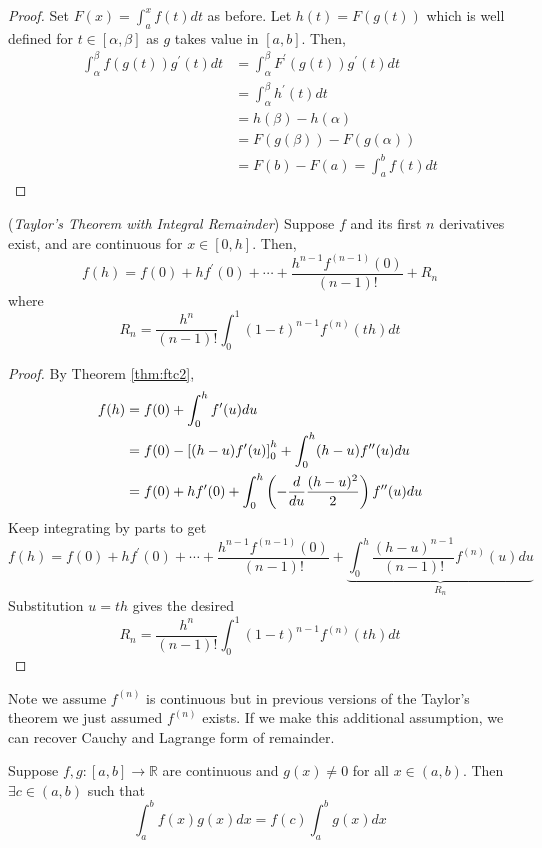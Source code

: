 \documentclass[10pt, a4paper, twoside]{report}
\begin{document}
\begin{proof}
    Set \(F(x)=\int_a^xf(t)dt\) as before. Let \(h(t)=F(g(t))\) which is well defined for \(t\in[\alpha,\beta]\) as \(g\) takes value in \([a,b]\). Then,
    \begin{align*}
        \int_\alpha^\beta f(g(t))g^\prime(t)dt&=\int_\alpha^\beta F^\prime(g(t))g^\prime(t)dt \\
        &=\int_\alpha^\beta h^\prime(t)dt \\
        &=h(\beta)-h(\alpha) \\
        &=F(g(\beta))-F(g(\alpha)) \\
        &=F(b)-F(a)=\int_a^bf(t)dt
    \end{align*}
\end{proof}
\begin{theorem}
    (\emph{Taylor's Theorem with Integral Remainder})
    Suppose \(f\) and its first \(n\) derivatives exist, and are continuous for \(x\in[0,h]\). Then,
    \[f(h)=f(0)+hf^\prime(0)+\cdots+\frac{h^{n-1}f^{(n-1)}(0)}{(n-1)!}+R_n\]
    where 
    \[R_n=\frac{h^n}{(n-1)!}\int_0^1(1-t)^{n-1}f^{(n)}(th)dt\]
    \label{thm:taylor_integral}
\end{theorem}
\begin{proof}
    By Theorem \ref{thm:ftc2},
    \begin{align*}
        f(h)&=f(0)+\int_0^hf^\prime(u)du \\
        &=f(0)-\left[(h-u)f^\prime(u)\right]_0^h+\int_0^h(h-u)f^{\prime\prime}(u)du \\
        &=f(0)+hf^\prime(0)+\int_0^h\left(-\frac d{du}\frac{(h-u)^2}{2}\right)f^{\prime\prime}(u)du
    \end{align*}
    Keep integrating by parts to get 
    \[f(h)=f(0)+hf^\prime(0)+\cdots+\frac{h^{n-1}f^{(n-1)}(0)}{(n-1)!}+\underbrace{\int_0^h\frac{(h-u)^{n-1}}{(n-1)!}f^{(n)}(u)du}_{R_n}\]
    Substitution \(u=th\) gives the desired
    \[R_n=\frac{h^n}{(n-1)!}\int_0^1(1-t)^{n-1}f^{(n)}(th)dt\] 
\end{proof}
\begin{remark}
    Note we assume \(f^{(n)}\) is continuous but in previous versions of the Taylor's theorem we just assumed \(f^{(n)}\) exists. If we make this additional assumption, we can recover Cauchy and Lagrange form of remainder.
\end{remark}
\begin{theorem}
    Suppose \(f,g:[a,b]\to\mathbb{R}\) are continuous and \(g(x)\neq 0\) for all \(x\in(a,b)\). Then \(\exists c\in(a,b)\) such that 
    \[\int_a^bf(x)g(x)dx=f(c)\int_a^bg(x)dx\]
    \label{thm:mvt_integral}
\end{theorem}
\end{document}
